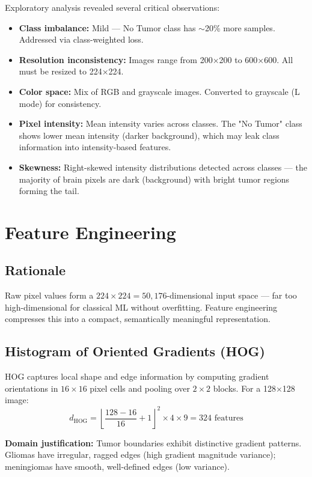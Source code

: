 \documentclass[12pt,a4paper]{article}
\begin{document}
Exploratory analysis revealed several critical observations:
\begin{itemize}[noitemsep]
    \item \textbf{Class imbalance:} Mild — No Tumor class has $\sim$20\% more samples. Addressed via class-weighted loss.
    \item \textbf{Resolution inconsistency:} Images range from 200×200 to 600×600. All must be resized to 224×224.
    \item \textbf{Color space:} Mix of RGB and grayscale images. Converted to grayscale (L mode) for consistency.
    \item \textbf{Pixel intensity:} Mean intensity varies across classes. The "No Tumor" class shows lower mean intensity (darker background), which may leak class information into intensity-based features.
    \item \textbf{Skewness:} Right-skewed intensity distributions detected across classes — the majority of brain pixels are dark (background) with bright tumor regions forming the tail.
\end{itemize}

\section{Feature Engineering}

\subsection{Rationale}

Raw pixel values form a $224 \times 224 = 50{,}176$-dimensional input space — far too high-dimensional for classical ML without overfitting. Feature engineering compresses this into a compact, semantically meaningful representation.

\subsection{Histogram of Oriented Gradients (HOG)}

HOG \citep{dalal2005histograms} captures local shape and edge information by computing gradient orientations in $16 \times 16$ pixel cells and pooling over $2 \times 2$ blocks. For a 128×128 image:
\[
d_{\text{HOG}} = \left\lfloor \frac{128 - 16}{16} + 1 \right\rfloor^2 \times 4 \times 9 = 324 \text{ features}
\]

\textbf{Domain justification:} Tumor boundaries exhibit distinctive gradient patterns. Gliomas have irregular, ragged edges (high gradient magnitude variance); meningiomas have smooth, well-defined edges (low variance).
\end{document}
